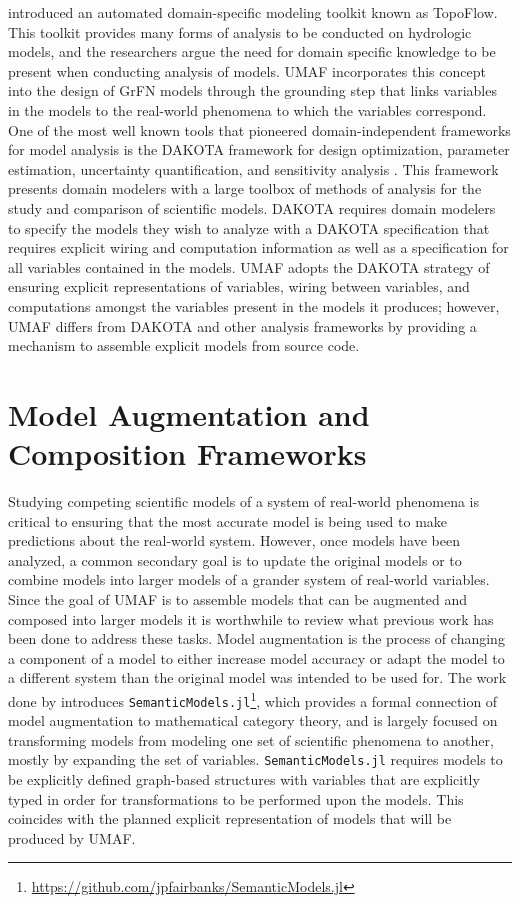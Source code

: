 \citet{peckham2017reproducible} introduced an automated domain-specific modeling toolkit known as TopoFlow.
This toolkit provides many forms of analysis to be conducted on hydrologic models, and the researchers argue the need for domain specific knowledge to be present when conducting analysis of models.
UMAF incorporates this concept into the design of GrFN models through the grounding step that links variables in the models to the real-world phenomena to which the variables correspond.
One of the most well known tools that pioneered domain-independent frameworks for model analysis is the DAKOTA framework for design optimization, parameter estimation, uncertainty quantification, and sensitivity analysis \citep{adams2009dakota}.
This framework presents domain modelers with a large toolbox of methods of analysis for the study and comparison of scientific models.
DAKOTA requires domain modelers to specify the models they wish to analyze with a DAKOTA specification that requires explicit wiring and computation information as well as a specification for all variables contained in the models.
UMAF adopts the DAKOTA strategy of ensuring explicit representations of variables, wiring between variables, and computations amongst the variables present in the models it produces; however, UMAF differs from DAKOTA and other analysis frameworks by providing a mechanism to assemble explicit models from source code.

\section{Model Augmentation and Composition Frameworks \label{sec:rwork_composition}}
Studying competing scientific models of a system of real-world phenomena is critical to ensuring that the most accurate model is being used to make predictions about the real-world system.
However, once models have been analyzed, a common secondary goal is to update the original models or to combine models into larger models of a grander system of real-world variables.
Since the goal of UMAF is to assemble models that can be augmented and composed into larger models it is worthwhile to review what previous work has been done to address these tasks.
Model augmentation is the process of changing a component of a model to either increase model accuracy or adapt the model to a different system than the original model was intended to be used for.
The work done by \citet{semanticModels2019} introduces \texttt{SemanticModels.jl}\footnote{\url{https://github.com/jpfairbanks/SemanticModels.jl}}, which provides a formal connection of model augmentation to mathematical category theory, and is largely focused on transforming models from modeling one set of scientific phenomena to another, mostly by expanding the set of variables.
\texttt{SemanticModels.jl} requires models to be explicitly defined graph-based structures with variables that are explicitly typed in order for transformations to be performed upon the models.
This coincides with the planned explicit representation of models that will be produced by UMAF.


